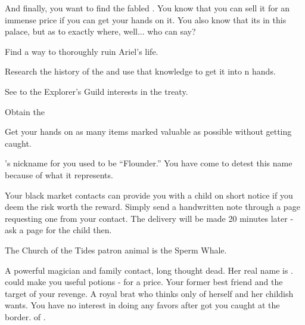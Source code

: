 \documentclass[char]{NeptuneBall}
\begin{document}
And finally, you want to find the fabled \iGlowShell{\MYname}. You know that you can sell it for an immense price if you can get your hands on it. You also know that its in this palace, but as to exactly where, well... who can say?

\begin{itemz}[Goals]
  \item Find a way to thoroughly ruin Ariel's life.
	\item Research the history of the \pGazaStrip{} and use that knowledge to get it into \pAtlantis{}n hands.
	\item See to the Explorer's Guild interests in the treaty.
	\item Obtain the \iGlowShell{}
	\item Get your hands on as many items marked valuable as possible without getting caught.
\end{itemz}

\begin{itemz}[Notes]
	\item \cAriel{}'s nickname for you used to be ``Flounder.'' You have come to detest this name because of what it represents.
  \item Your black market contacts can provide you with a child on short notice if you deem the risk worth the reward. Simply send a handwritten note through a page requesting one from your contact. The delivery will be made 20 minutes later - ask a page for the child then. 
\end{itemz}

\begin{itemz}[Trivia]
  \item The Church of the Tides patron animal is the Sperm Whale.
\end{itemz}

\begin{contacts}
  \contact{\cWitch{\MYname}} A powerful magician and family contact, long thought dead. Her real name is \cWitch{}. \cWitch{\They} could make you useful potions - for a price.
  \contact{\cAriel{}} Your former best friend and the target of your revenge.
  \contact{\cPrincess{}} A royal brat who thinks only of herself and her childish wants. You have no interest in doing \cPrincess{\them} any favors after \cPrincess{\they} got you caught at the border.
  \contact{\cKing{}} \cKing{\King} of \pAtlantis{}. 
\end{contacts}
\end{document}
